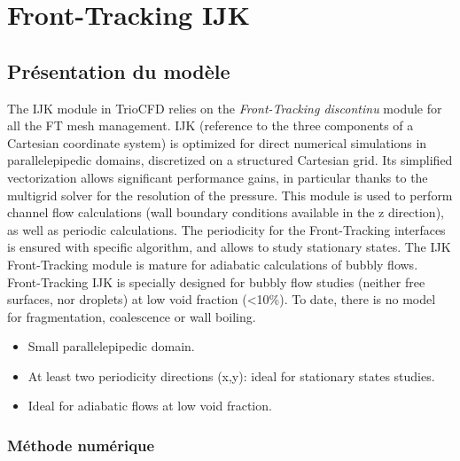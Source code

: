 \newpage


\chapter{Front-Tracking IJK}
\label{sec:IJK}

\section{Pr\'esentation du mod\`ele}

The IJK module in TrioCFD relies on the \textit{Front-Tracking discontinu} module for all the FT mesh management. IJK (reference to the three components of a Cartesian coordinate system) is optimized for direct numerical simulations in parallelepipedic domains, discretized on a structured Cartesian grid. Its simplified vectorization allows significant performance gains, in particular thanks to the multigrid solver for the resolution of the pressure. This module is used to perform channel flow calculations (wall boundary conditions available in the z direction), as well as periodic calculations. The periodicity for the Front-Tracking interfaces is ensured with specific algorithm, and allows to study stationary states. The IJK Front-Tracking module is mature for adiabatic calculations of bubbly flows. Front-Tracking IJK is specially designed for bubbly flow studies (neither free surfaces, nor droplets) at low void fraction (<10\%). To date, there is no model for fragmentation, coalescence or wall boiling.

\begin{itemize}
\item Small parallelepipedic domain.
\item At least two periodicity directions (x,y): ideal for stationary states studies.
\item Ideal for adiabatic flows at low void fraction.
\end{itemize}

\subsection{M\'ethode num\'erique}

